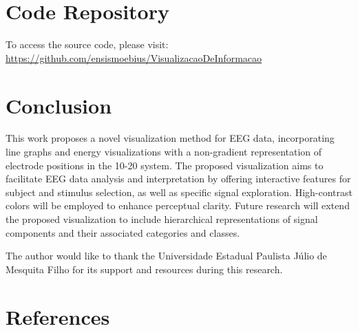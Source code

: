 \documentclass[format=acmtog]{acmart}
\begin{document}
	\section{Code Repository}
	To access the source code, please visit: \href{https://github.com/ensismoebius/VisualizacaoDeInformacao}{https://github.com/ensismoebius/VisualizacaoDeInformacao}
	
	\section{Conclusion}
	This work proposes a novel visualization method for EEG data, incorporating line graphs and energy visualizations with a non-gradient representation of electrode positions in the 10-20 system. The proposed visualization aims to facilitate EEG data analysis and interpretation by offering interactive features for subject and stimulus selection, as well as specific signal exploration. High-contrast colors will be employed to enhance perceptual clarity. Future research will extend the proposed visualization to include hierarchical representations of signal components and their associated categories and classes.
	
	\begin{acks}
		The author would like to thank the Universidade Estadual Paulista Júlio de Mesquita Filho for its support and resources during this research.
	\end{acks}
	
	\section{References}
	
	
	
\end{document}
